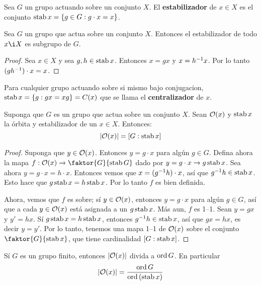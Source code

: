 \begin{definition}
    Sea $G$ un grupo actuando sobre un conjunto  $X$. El  \textbf{estabilizador}
    de $x \in X$ es el conjunto  $\operatorname{stab}{x}=\{g \in G : g \cdot x=x\}$.
\end{definition}

\begin{lemma}\label{7.28}
    Sea $G$ un grupo que actua sobre un conjunto $X$. Entonces el estabilizador
    de todo $x \i X$ es subgrupo de  $G$.
\end{lemma}
\begin{proof}
    Sea $x \in X$ y sea $g,h \in \operatorname{stab}{x}$. Entonces $x=gx$ y  $x=h^{-1}x$. Por
    lo tanto $(gh^{-1}) \cdot x=x$.
\end{proof}

\begin{example}\label{}
    Para cualquier grupo actuando sobre si mismo bajo conjugacion,
    $\operatorname{stab}{x}=\{g : gx=xg\}=C(x)$ que se llama el \textbf{centralizador} de $x$.
\end{example}

\begin{theorem}\label{7.29}
    Suponga que $G$ es un grupo que actua sobre un conjunto  $X$. Sean  $
    \mathcal{O}(x)$ y $\operatorname{stab}{x}$ la \'orbita y estabilizador de un $x \in X$. Entonces:
    \begin{equation*}
        |\mathcal{O}(x)|=[G:\operatorname{stab}{x}]
    \end{equation*}
\end{theorem}
\begin{proof}
    Suponga que $y \in \mathcal{O}(x)$. Entonces $y=g \cdot x$ para alg\'un  $g \in G$.
    Defina ahora la mapa  $f:\Oc(x) \xrightarrow{} \faktor{G}{\stab{G}}$ dado
    por $y=g \cdot x \xrightarrow{} g\operatorname{stab}{x}$. Sea ahora $y=g \cdot x=h \cdot
    x$. Entonces vemos que  $x=(g^{-1}h) \cdot x$, as\'i que $g^{-1}h \in
    \operatorname{stab}{x}$. Esto hace que $g\operatorname{stab}{x}=h\operatorname{stab}{x}$. Por lo tanto $f$ es bien
    definida.

    Ahora, vemos que $f$ es sobre; s\'i $y \in \mathcal{O}(x)$, entonces $y=g \cdot x$
    para alg\'un $g \in G$, as\'i que a cada  $y \in \mathcal{O}(x)$ est\'a asignada a
    un $g\operatorname{stab}{x}$. M\'as aun, $f$ es 1--1. Sean $y=gx$ y  $y'=hx$. S\'i
    $g\operatorname{stab}{x}=h\operatorname{stab}{x}$, entonces $g^{-1}h \in \operatorname{stab}{x}$, as\'i que $gx=hx$,
    es decir  $y=y'$. Por lo tanto, tenemos una mapa 1--1 de  $\mathcal{O}(x)$ sobre el
    conjunto $\faktor{G}{\stab{x}}$, que tiene cardinalidad $[G:\operatorname{stab}{x}]$.
\end{proof}
\begin{corollary}
    S\'i $G$ es un grupo finito, entonces  $|\mathcal{O}(x)|$ divida a $\operatorname{ord}{G}$. En
    particular
    \begin{equation*}
        |\mathcal{O}(x)|=\frac{\operatorname{ord}{G}}{\operatorname{ord}{(\operatorname{stab}{x})}}
    \end{equation*}
\end{corollary}

